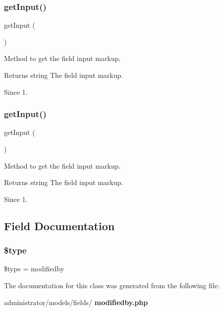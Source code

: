 \subsubsection{get\+Input()\hspace{0.1cm}{\footnotesize\ttfamily [1/2]}}
{\footnotesize\ttfamily get\+Input (\begin{DoxyParamCaption}{ }\end{DoxyParamCaption})\hspace{0.3cm}{\ttfamily [protected]}}

Method to get the field input markup.

\begin{DoxyReturn}{Returns}
string The field input markup.
\end{DoxyReturn}
\begin{DoxySince}{Since}
1. 
\end{DoxySince}
\mbox{\label{class_j_form_field_modifiedby_a4380f30ae9202fa49ebd2439572f9cdb}} 
\subsubsection{get\+Input()\hspace{0.1cm}{\footnotesize\ttfamily [2/2]}}
{\footnotesize\ttfamily get\+Input (\begin{DoxyParamCaption}{ }\end{DoxyParamCaption})\hspace{0.3cm}{\ttfamily [protected]}}

Method to get the field input markup.

\begin{DoxyReturn}{Returns}
string The field input markup.
\end{DoxyReturn}
\begin{DoxySince}{Since}
1. 
\end{DoxySince}


\subsection{Field Documentation}
\mbox{\label{class_j_form_field_modifiedby_a9a4a6fba2208984cabb3afacadf33919}} 
\subsubsection{\$type}
{\footnotesize\ttfamily \$type = \textquotesingle{}modifiedby\textquotesingle{}\hspace{0.3cm}{\ttfamily [protected]}}



The documentation for this class was generated from the following file\+:\begin{DoxyCompactItemize}
\item 
administrator/models/fields/\textbf{ modifiedby.\+php}\end{DoxyCompactItemize}
